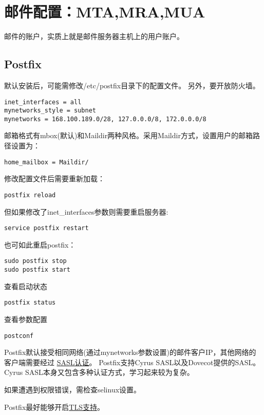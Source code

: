 \section{邮件配置：MTA,MRA,MUA}

邮件的账户，实质上就是邮件服务器主机上的用户账户。

\subsection{Postfix}
默认安装后，可能需修改/etc/postfix目录下的配置文件。
另外，要开放防火墙。


\begin{verbatim}
inet_interfaces = all
mynetworks_style = subnet
mynetworks = 168.100.189.0/28, 127.0.0.0/8, 172.0.0.0/8
\end{verbatim}

邮箱格式有mbox(默认)和Maildir两种风格。采用Maildir方式，设置用户的邮箱路径设置为：
\begin{verbatim}
home_mailbox = Maildir/
\end{verbatim}

修改配置文件后需要重新加载：
\begin{verbatim}
postfix reload
\end{verbatim}

但如果修改了inet\_interfaces参数则需要重启服务器:
\begin{verbatim}
service postfix restart
\end{verbatim}

也可如此重启postfix：
\begin{verbatim}
sudo postfix stop
sudo postfix start
\end{verbatim}

查看启动状态
\begin{verbatim}
postfix status
\end{verbatim}


查看参数配置
\begin{verbatim}
postconf 
\end{verbatim}


Postfix默认接受相同网络(通过mynetworks参数设置)的邮件客户IP，其他网络的客户端需要经过
\href{http://www.postfix.org/SASL_README.html}{SASL认证}。
Postfix支持Cyrus SASL以及Dovecot提供的SASL。
Cyrus SASL本身又包含多种认证方式，学习起来较为复杂。

如果遭遇到权限错误，需检查selinux设置。 



Postfix最好能够开启\href{http://www.postfix.org/TLS_README.html}{TLS支持}。



